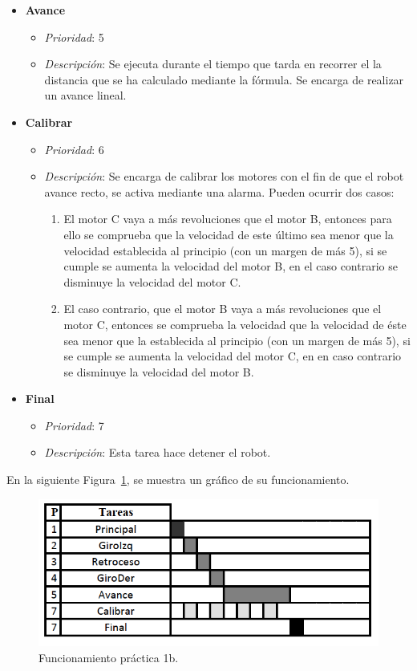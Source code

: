 \begin{itemize}
		
	\item \textbf{Avance}
		\begin{itemize}
			\item \textit{Prioridad}: 5
			\item \textit{Descripción}: Se ejecuta durante el tiempo que tarda en recorrer el la distancia que se ha calculado mediante la fórmula. Se encarga de realizar un avance lineal.
		\end{itemize}
	
	\item \textbf{Calibrar}
		\begin{itemize}
			\item \textit{Prioridad}: 6
			\item \textit{Descripción}: Se encarga de calibrar los motores con el fin de que el robot avance recto, se activa mediante una alarma. Pueden ocurrir dos casos:
			\begin{enumerate}
				\item El motor C vaya a más revoluciones que el motor B, entonces para ello se comprueba que la velocidad de este último sea menor que la velocidad establecida al principio (con un margen de más 5), si se cumple se aumenta la velocidad del motor B, en el caso contrario se disminuye la velocidad del motor C.
				\item El caso contrario, que el motor B vaya a más revoluciones que el motor C, entonces se comprueba la velocidad que la velocidad de éste sea menor que la establecida al principio (con un margen de más 5), si se cumple se aumenta la velocidad del motor C, en en caso contrario se disminuye la velocidad del motor B.
			\end{enumerate}
		\end{itemize}
	
	\item \textbf{Final}
		\begin{itemize}
			\item \textit{Prioridad}: 7
			\item \textit{Descripción}: Esta tarea hace detener el robot.
		\end{itemize}
\end{itemize}


En la siguiente Figura~\ref{grafico1b}, se muestra un gráfico de su funcionamiento.

\begin{figure}[H]
 \centering
 \includegraphics[scale=0.4]{./img/grafico1b.png}
 \caption{Funcionamiento práctica 1b.}
 \label{grafico1b}
\end{figure}

